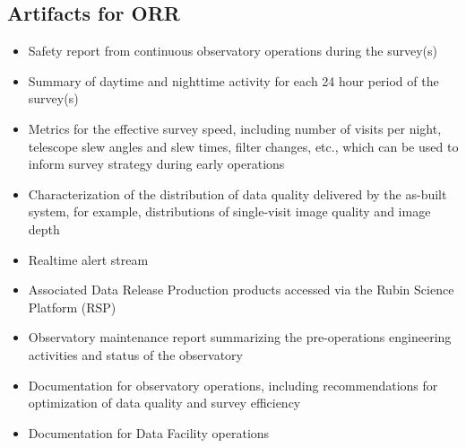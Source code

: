 

\subsection{Artifacts for ORR}

\begin{itemize}
\item Safety report from continuous observatory operations during the survey(s)
\item Summary of daytime and nighttime activity for each 24 hour period of the survey(s)
\item Metrics for the effective survey speed, including number of visits per night, telescope slew angles and slew times, filter changes, etc., which can be used to inform survey strategy during early operations
\item Characterization of the distribution of data quality delivered by the as-built system, for example, distributions of single-visit image quality and image depth
\item Realtime alert stream
\item Associated Data Release Production products accessed via the Rubin Science Platform (RSP)
\item Observatory maintenance report summarizing the pre-operations engineering activities and status of the observatory
\item Documentation for observatory operations, including recommendations for optimization of data quality and survey efficiency
\item Documentation for Data Facility operations
\end{itemize}

